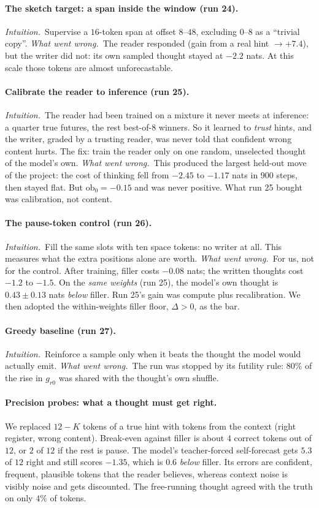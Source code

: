 \documentclass[11pt]{article}
\newcommand{\why}{\emph{Intuition.}\ }
\newcommand{\fail}{\emph{What went wrong.}\ }
\begin{document}
\paragraph{The sketch target: a span inside the window (run 24).}
\why Supervise a $16$-token span at offset $8$--$48$, excluding $0$--$8$ as a ``trivial copy''.
\fail The reader responded (gain from a real hint $\to+7.4$), but the writer did not: its own sampled thought stayed at $-2.2$ nats. At this scale those tokens are almost unforecastable.

\paragraph{Calibrate the reader to inference (run 25).}
\why The reader had been trained on a mixture it never meets at inference: a quarter true futures, the rest best-of-8 winners. So it learned to \emph{trust} hints, and the writer, graded by a trusting reader, was never told that confident wrong content hurts. The fix: train the reader only on one random, unselected thought of the model's own.
\fail This produced the largest held-out move of the project: the cost of thinking fell from $-2.45$ to $-1.17$ nats in 900 steps, then stayed flat. But $\mathrm{ob}_0=-0.15$ and was never positive. What run 25 bought was calibration, not content.

\paragraph{The pause-token control (run 26).}
\why Fill the same slots with ten space tokens: no writer at all. This measures what the extra positions alone are worth.
\fail For us, not for the control. After training, filler costs $-0.08$ nats; the written thoughts cost $-1.2$ to $-1.5$. On the \emph{same weights} (run 25), the model's own thought is $0.43\pm0.13$ nats \emph{below} filler. Run 25's gain was compute plus recalibration. We then adopted the within-weights filler floor, $\Delta>0$, as the bar.

\paragraph{Greedy baseline (run 27).}
\why Reinforce a sample only when it beats the thought the model would actually emit.
\fail The run was stopped by its futility rule: $80\%$ of the rise in $g_{r0}$ was shared with the thought's own shuffle.

\paragraph{Precision probes: what a thought must get right.}
We replaced $12-K$ tokens of a true hint with tokens from the context (right register, wrong content). Break-even against filler is about $4$ correct tokens out of $12$, or $2$ of $12$ if the rest is pause. The model's teacher-forced self-forecast gets $5.3$ of $12$ right and still scores $-1.35$, which is $0.6$ \emph{below} filler. Its errors are confident, frequent, plausible tokens that the reader believes, whereas context noise is visibly noise and gets discounted. The free-running thought agreed with the truth on only $4\%$ of tokens.
\end{document}
